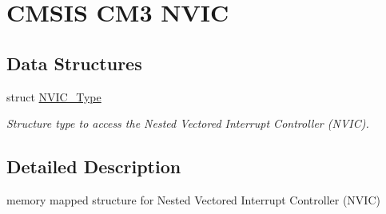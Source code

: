 \hypertarget{group___c_m_s_i_s___c_m3___n_v_i_c}{\section{C\-M\-S\-I\-S C\-M3 N\-V\-I\-C}
\label{group___c_m_s_i_s___c_m3___n_v_i_c}
}
\subsection*{Data Structures}
\begin{DoxyCompactItemize}
\item 
struct \hyperlink{struct_n_v_i_c___type}{N\-V\-I\-C\-\_\-\-Type}
\begin{DoxyCompactList}\small\item\em Structure type to access the Nested Vectored Interrupt Controller (N\-V\-I\-C). \end{DoxyCompactList}\end{DoxyCompactItemize}


\subsection{Detailed Description}
memory mapped structure for Nested Vectored Interrupt Controller (N\-V\-I\-C) 
